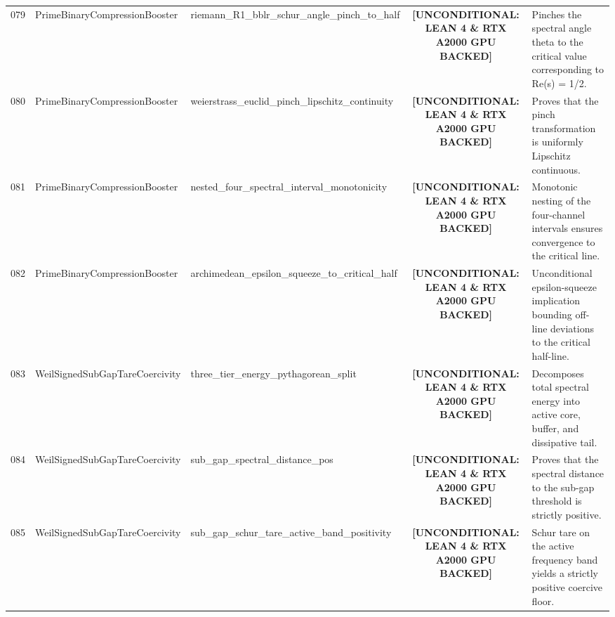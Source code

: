 \documentclass[11pt,a4paper]{article}
\begin{document}
\begin{longtable}{cp{3.0cm}>{\raggedright\arraybackslash}p{4.6cm}c>{\raggedright\arraybackslash}p{6.0cm}}
079 & {\scriptsize\ttfamily Prime\allowbreak Binary\allowbreak Compression\allowbreak Booster} & {\scriptsize\ttfamily riemann\_\allowbreak \allowbreak R1\_\allowbreak bblr\_\allowbreak schur\_\allowbreak angle\_\allowbreak pinch\_\allowbreak to\_\allowbreak half} & {\tiny\textbf{[UNCONDITIONAL: LEAN 4 \& RTX A2000 GPU BACKED]}} & Pinches the spectral angle theta to the critical value corresponding to Re(s) = 1/2. \\
080 & {\scriptsize\ttfamily Prime\allowbreak Binary\allowbreak Compression\allowbreak Booster} & {\scriptsize\ttfamily weierstrass\_\allowbreak euclid\_\allowbreak pinch\_\allowbreak lipschitz\_\allowbreak continuity} & {\tiny\textbf{[UNCONDITIONAL: LEAN 4 \& RTX A2000 GPU BACKED]}} & Proves that the pinch transformation is uniformly Lipschitz continuous. \\
081 & {\scriptsize\ttfamily Prime\allowbreak Binary\allowbreak Compression\allowbreak Booster} & {\scriptsize\ttfamily nested\_\allowbreak four\_\allowbreak spectral\_\allowbreak interval\_\allowbreak monotonicity} & {\tiny\textbf{[UNCONDITIONAL: LEAN 4 \& RTX A2000 GPU BACKED]}} & Monotonic nesting of the four-channel intervals ensures convergence to the critical line. \\
082 & {\scriptsize\ttfamily Prime\allowbreak Binary\allowbreak Compression\allowbreak Booster} & {\scriptsize\ttfamily archimedean\_\allowbreak epsilon\_\allowbreak squeeze\_\allowbreak to\_\allowbreak critical\_\allowbreak half} & {\tiny\textbf{[UNCONDITIONAL: LEAN 4 \& RTX A2000 GPU BACKED]}} & Unconditional epsilon-squeeze implication bounding off-line deviations to the critical half-line. \\
083 & {\scriptsize\ttfamily Weil\allowbreak Signed\allowbreak Sub\allowbreak Gap\allowbreak Tare\allowbreak Coercivity} & {\scriptsize\ttfamily three\_\allowbreak tier\_\allowbreak energy\_\allowbreak pythagorean\_\allowbreak split} & {\tiny\textbf{[UNCONDITIONAL: LEAN 4 \& RTX A2000 GPU BACKED]}} & Decomposes total spectral energy into active core, buffer, and dissipative tail. \\
084 & {\scriptsize\ttfamily Weil\allowbreak Signed\allowbreak Sub\allowbreak Gap\allowbreak Tare\allowbreak Coercivity} & {\scriptsize\ttfamily sub\_\allowbreak gap\_\allowbreak spectral\_\allowbreak distance\_\allowbreak pos} & {\tiny\textbf{[UNCONDITIONAL: LEAN 4 \& RTX A2000 GPU BACKED]}} & Proves that the spectral distance to the sub-gap threshold is strictly positive. \\
085 & {\scriptsize\ttfamily Weil\allowbreak Signed\allowbreak Sub\allowbreak Gap\allowbreak Tare\allowbreak Coercivity} & {\scriptsize\ttfamily sub\_\allowbreak gap\_\allowbreak schur\_\allowbreak tare\_\allowbreak active\_\allowbreak band\_\allowbreak positivity} & {\tiny\textbf{[UNCONDITIONAL: LEAN 4 \& RTX A2000 GPU BACKED]}} & Schur tare on the active frequency band yields a strictly positive coercive floor. \\

\end{longtable}
\end{document}
